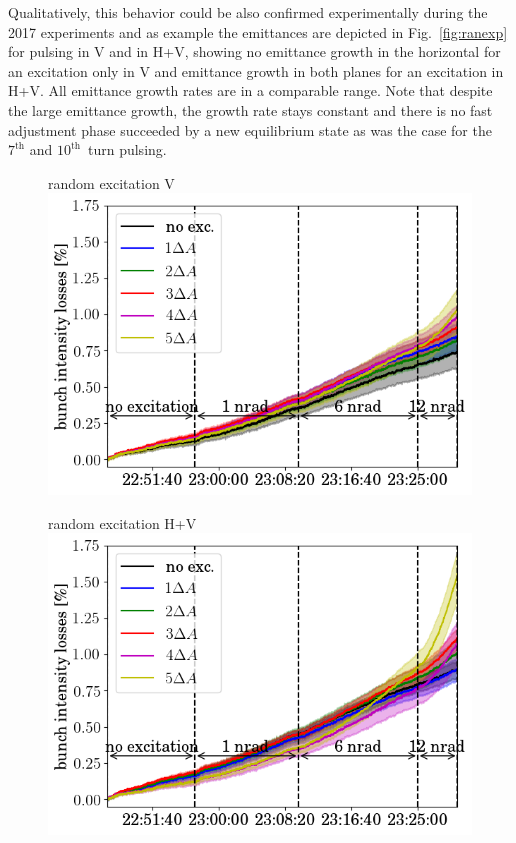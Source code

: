\documentclass[%
 reprint,
 amsmath,amssymb,
 aps,
prstab,
]{revtex4-1}
\begin{document}
Qualitatively, this behavior could be also confirmed experimentally during the 2017 experiments and as example the emittances are depicted in Fig.~\ref{fig:ranexp} for pulsing in V and in H+V, showing no emittance growth in the horizontal for an excitation only in V and emittance growth in both planes for an excitation in H+V. All emittance growth rates are in a comparable range. Note that despite the large emittance growth, the growth rate stays constant and there is no fast adjustment phase succeeded by a new equilibrium state as was the case for the $7^{\mathrm{th}}$ and $10^{\mathrm{th}}$~turn pulsing.
\begin{figure}[h]
	\begin{minipage}[t]{0.49\linewidth}
		\centering
		random excitation V
		\includegraphics[width=1.0\linewidth]{2017_bunch_intensity_vran_no_damper_avg.png}
	\end{minipage}	
	\begin{minipage}[t]{0.49\linewidth}
		\centering
		random excitation H+V
		\includegraphics[width=1.0\linewidth]{2017_bunch_intensity_hvran_no_damper_avg.png}

\end{minipage}
\end{figure}
\end{document}
